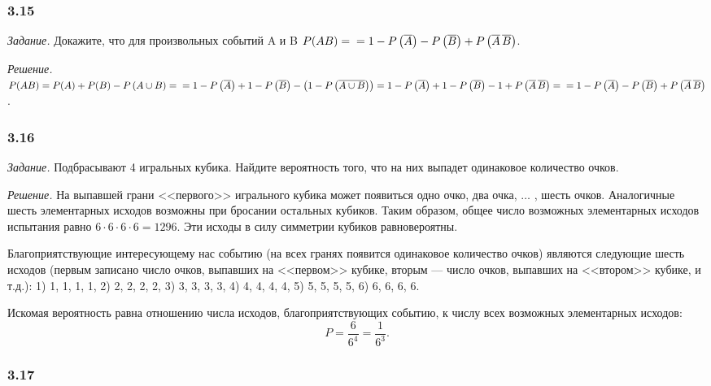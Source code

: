 \documentclass{book}
\begin{document}
\subsubsection*{3.15}

\textit{Задание.} Докажите, что для произвольных событий A и B
$ P( AB ) = \\
= 1 - P\left( \overline{ A } \right) - P \left( \overline{ B } \right) + P \left( \overline{ A } \, \overline{ B } \right) $.

\textit{Решение.}
$ P( AB ) =
P(A) + P(B) - P \left( A \cup B \right) = \\
= 1 - P \left( \overline{ A }\right) + 1 - P \left( \overline{ B } \right) - \left( 1 - P \left( \overline{ A \cup B } \right) \right) =
1 - P \left( \overline{ A } \right) + 1 - P \left( \overline{ B } \right) - 1 + P \left( \overline{ A } \, \overline{ B } \right) = \\
= 1 - P \left( \overline{ A } \right) - P \left( \overline{ B } \right) + P \left( \overline{ A } \, \overline{ B } \right) $.

\subsubsection*{3.16}

\textit{Задание.} Подбрасывают 4 игральных кубика.
Найдите вероятность того, что на них выпадет одинаковое количество очков.

\textit{Решение.} На выпавшей грани <<первого>> игрального кубика может появиться одно очко, два очка,  $ \dotsc $ , шесть очков.
Аналогичные шесть элементарных исходов возможны при бросании остальных кубиков.
Таким образом, общее число возможных элементарных исходов испытания равно $ 6 \cdot 6 \cdot 6 \cdot 6 = 1296 $.
Эти исходы в силу симметрии кубиков равновероятны.

Благоприятствующие интересующему нас событию
(на всех гранях появится одинаковое количество очков)
являются следующие шесть исходов
(первым записано число очков,
выпавших на <<первом>> кубике,
вторым --- число очков, выпавших на <<втором>> кубике, и т.д.): 1) 1, 1, 1, 1, 2) 2, 2, 2, 2, 3) 3, 3, 3, 3, 4) 4, 4, 4, 4, 5) 5, 5, 5, 5, 6) 6, 6, 6, 6.

Искомая вероятность равна отношению числа исходов, благоприятствующих событию, к числу всех возможных элементарных исходов:
$$ P =
\frac{6}{6^4} = \frac{1}{6^3}.$$

\subsubsection*{3.17}
\end{document}
